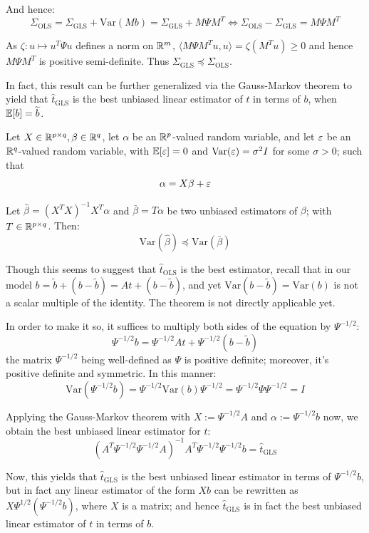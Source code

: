 And hence:
\[
    \Sigma_\text{OLS} = \Sigma_\text{GLS} + \mathrm{Var}(Mb) = \Sigma_\text{GLS} + M\Psi M^T \iff \Sigma_\text{OLS} - \Sigma_\text{GLS} = M\Psi M^T
\]

As $\zeta: u\mapsto u^T\Psi u$ defines a norm on $\mathbb R^m$, $\langle M\Psi M^Tu, u\rangle = \zeta(M^Tu) \geq 0$ and hence $M\Psi M^T$ is positive semi-definite. Thus $\Sigma_\text{GLS} \preceq \Sigma_\text{OLS}$.

In fact, this result can be further generalized via the Gauss-Markov theorem to yield that $\hat t_\text{GLS}$ is the best unbiased linear estimator of $t$ in terms of $b$, when $\mathbb E[b]=\widetilde b$.

\begin{Theorem}
Let $X\in\mathbb R^{p\times q},\beta\in\mathbb R^q$, let $\alpha$ be an $\mathbb R^p$-valued random variable, and let $\varepsilon$ be an $\mathbb R^q$-valued random variable, with $\mathbb E[\varepsilon]=0$ and $\mathrm{Var}(\varepsilon)=\sigma^2 I$ for some $\sigma>0$; such that
\[
    \alpha = X\beta + \varepsilon
\]

Let $\hat \beta = (X^TX)^{-1}X^T\alpha$ and $\bar \beta = T\alpha$ be two unbiased estimators of $\beta$; with $T\in\mathbb R^{p\times q}$. Then:
\[
    \mathrm{Var}(\hat\beta) \preceq \mathrm{Var}(\bar\beta)
\]
\end{Theorem}

Though this seems to suggest that $\hat t_\text{OLS}$ is the best estimator, recall that in our model $b = \widetilde b + (b-\widetilde b) = At + (b-\widetilde b)$, and yet $\mathrm{Var}(b-\widetilde b)=\mathrm{Var}(b)$ is not a scalar multiple of the identity. The theorem is not directly applicable yet.

In order to make it so, it suffices to multiply both sides of the equation by $\Psi^{-1/2}$:
\[
    \Psi^{-1/2}b = \Psi^{-1/2}At + \Psi^{-1/2}(b-\widetilde b)
\]
the matrix $\Psi^{-1/2}$ being well-defined as $\Psi$ is positive definite; moreover, it's positive definite and symmetric. In this manner:
\[
    \mathrm{Var}(\Psi^{-1/2}b) = \Psi^{-1/2}\mathrm{Var}(b)\Psi^{-1/2} = \Psi^{-1/2}\Psi\Psi^{-1/2} = I
\]

Applying the Gauss-Markov theorem with $X:=\Psi^{-1/2}A$ and $\alpha:=\Psi^{-1/2}b$ now, we obtain the best unbiased linear estimator for $t$:
\[
    (A^T\Psi^{-1/2}\Psi^{-1/2}A)^{-1}A^T\Psi^{-1/2}\Psi^{-1/2}b = \hat t_\text{GLS}
\]

Now, this yields that $\hat t_\text{GLS}$ is the best unbiased linear estimator in terms of $\Psi^{-1/2}b$, but in fact any linear estimator of the form $Xb$ can be rewritten as $X\Psi^{1/2}(\Psi^{-1/2}b)$, where $X$ is a matrix; and hence $\hat t_\text{GLS}$ is in fact the best unbiased linear estimator of $t$ in terms of $b$.

